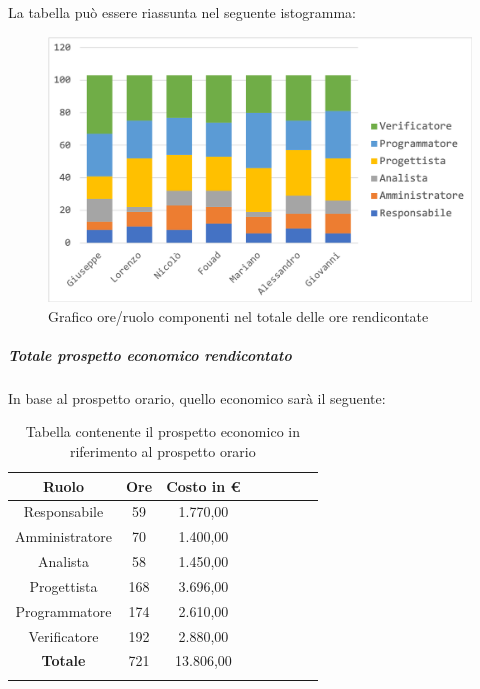				La tabella può essere riassunta nel seguente istogramma:
				\begin{figure}[H]
					\centering
					\includegraphics[width=0.8\linewidth]{./images/preventivo/totOreRed1.png}
					\caption{Grafico ore/ruolo componenti nel totale delle ore rendicontate}
					\label{fig:grafico suddivione ruoli totale ore rendicontete}
				\end{figure}
			
				\subparagraph{Totale prospetto economico rendicontato}
				In base al prospetto orario, quello economico sarà il seguente: 
				
				\begin{longtable}{|c|c|c|c|c|c|c|c|}
					\hline
					\rowcolor{lighter-grayer}
					\textbf{Ruolo} & \textbf{Ore} & \textbf{Costo in €} \\
					\hline
					\endfirsthead
					
					\hline
					Responsabile 	    & 59 & 1.770,00\\
					\hline 
					\hline
					Amministratore	  & 70 & 1.400,00\\
					\hline
					\hline
					Analista 				& 58 & 1.450,00\\
					\hline
					\hline
					Progettista 		  & 168 & 3.696,00\\
					\hline
					\hline
					Programmatore 	 & 174 & 2.610,00\\
					\hline
					\hline
					Verificatore 		  & 192 & 2.880,00\\
					\hline
					\textbf{Totale} 	& 721 & 13.806,00\\
					\hline
					\caption{Tabella contenente il prospetto economico in riferimento al prospetto orario}
				\end{longtable}
				\pagebreak
				
